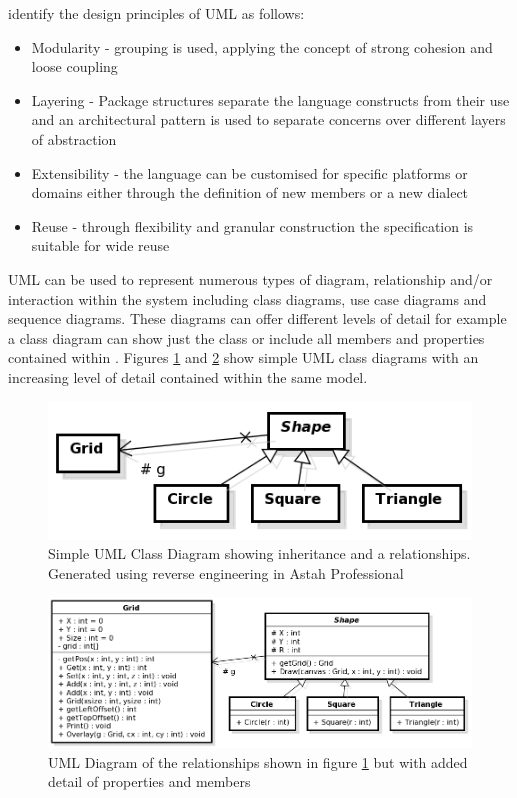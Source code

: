 \cite{omguml} identify the design principles of UML as follows:
\begin{itemize}
\item Modularity - grouping is used, applying the concept of strong cohesion and loose coupling
\item Layering - Package structures separate the language constructs from their use and an architectural pattern is used to separate concerns over different layers of abstraction
\item Extensibility - the language can be customised for specific platforms or domains either through the definition of new members or a new dialect
\item Reuse - through flexibility and granular construction the specification is suitable for wide reuse
\end{itemize}

UML can be used to represent numerous types of diagram, relationship and/or interaction within the system including class diagrams, use case diagrams and sequence diagrams. These diagrams can offer different levels of detail for example a class diagram can show just the class or include all members and properties contained within \citep{omguml}. Figures \ref{fig-lit-reverseengineering-umlexamplesimple} and \ref{fig-lit-reverseengineering-umlexampledetail} show simple UML class diagrams with an increasing level of detail contained within the same model.

\begin{figure}[hbtp]
\centering
\includegraphics[scale=0.8]{sections/literature/reverseengineering/uml-class-simple-astah}
\caption{Simple UML Class Diagram showing inheritance and a relationships. Generated using reverse engineering in Astah Professional}
\label{fig-lit-reverseengineering-umlexamplesimple}
\end{figure}

\begin{figure}[hbtp]
\centering
\includegraphics[scale=0.6]{sections/literature/reverseengineering/uml-class-detail-astah}\caption{UML Diagram of the relationships shown in figure \ref{fig-lit-reverseengineering-umlexamplesimple} but with added detail of properties and members}
\label{fig-lit-reverseengineering-umlexampledetail}
\end{figure}

